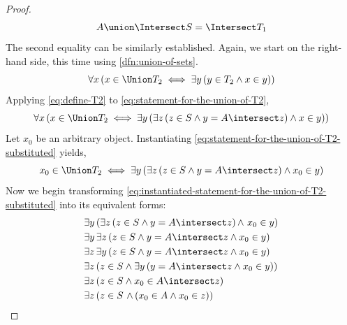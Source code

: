 \begin{proof}
\begin{equation*}
        A \union \Intersect S = \Intersect T_{1}
    \end{equation*}
    The second equality can be similarly established. Again, we start on the right-hand side, this time using
    \cref{dfn:union-of-sets}.
    \begin{equation}
        \label{eq:statement-for-the-union-of-T2}
        \forall x \, \mleft( x \in \Union T_{2}
        \iff
        \exists y \, \mleft( y \in T_{2} \land x \in y \mright)\mright)
    \end{equation}
    Applying \eqref{eq:define-T2} to \eqref{eq:statement-for-the-union-of-T2},
    \begin{equation}
        \label{eq:statement-for-the-union-of-T2-substituted}
        \forall x \, \mleft( x \in \Union T_{2} \iff \exists y \, \mleft( \exists z \, \mleft( z \in S \land y = A \intersect z \mright) \land x \in y \mright) \mright)
    \end{equation}
    Let \( x_{0} \) be an arbitrary object. Instantiating \eqref{eq:statement-for-the-union-of-T2-substituted} yields,
    \begin{equation}
        \label{eq:instantiated-statement-for-the-union-of-T2-substituted}
        x_{0} \in \Union T_{2}
        \iff
        \exists y \, \mleft( \exists z \, \mleft( z \in S \land y = A \intersect z \mright) \land x_{0} \in y \mright)
    \end{equation}
    Now we begin transforming \eqref{eq:instantiated-statement-for-the-union-of-T2-substituted} into its equivalent forms:
    \begin{equation*}
        \begin{aligned}
            &\exists y \, \mleft( \exists z \, \mleft( z \in S \land y = A \intersect z \mright) \,{\land}\,\, x_{0} \in y \mright)\\
            &\exists y \, \exists z \, \mleft( z \in S \land y = A \intersect z \land x_{0} \in y \mright)\\
            &\exists z \, \exists y \, \mleft( z \in S \land y = A \intersect z \land x_{0} \in y \mright)\\
            &\exists z \, \mleft( z \in S \land \exists y \, \mleft( y = A \intersect z \land x_{0} \in y \mright) \mright)\\
            &\exists z \, \mleft( z \in S \land x_{0} \in A \intersect z \mright)\\
            &\exists z \, \mleft( z \in S \,\,{\land}\, \mleft( x_{0} \in A \land x_{0} \in z \mright)\mright)\\

\end{aligned}
\end{equation*}
\end{proof}
